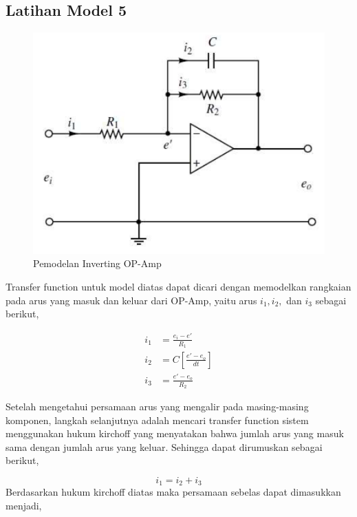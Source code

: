 \documentclass[12pt]{journal}
\begin{document}
\subsection{Latihan Model 5}
 
 \begin{figure}[H]
     \centering
     \includegraphics{model_nomor_5.png}
     \caption{Pemodelan Inverting OP-Amp}
     \label{soal_nomor_5}
 \end{figure}
 
 Transfer function untuk model diatas dapat dicari dengan memodelkan rangkaian pada arus yang masuk dan keluar dari OP-Amp, yaitu arus $i_1,i_2,$ dan $i_3$ sebagai berikut,
 
 \begin{equation}
     \begin{split}
         i_1 &= \frac{e_i-e'}{R_1} \\[5pt]
         i_2 &= C[\frac{e'-e_o}{dt}] \\[5pt]
         i_3 &= \frac{e'-e_o}{R_2}
     \end{split}
 \end{equation}
 
 Setelah mengetahui persamaan arus yang mengalir pada masing-masing komponen, langkah selanjutnya adalah mencari transfer function sistem menggunakan hukum kirchoff yang menyatakan bahwa jumlah arus yang masuk sama dengan jumlah arus yang keluar. Sehingga dapat dirumuskan sebagai berikut,
 
 \begin{equation*}
     i_1 = i_2+i_3
 \end{equation*}
 Berdasarkan hukum kirchoff diatas maka persamaan sebelas dapat dimasukkan menjadi,
\end{document}
